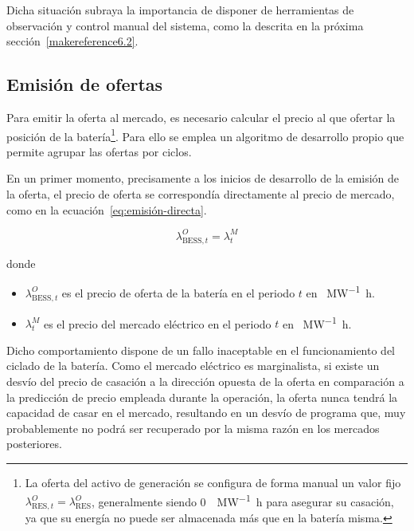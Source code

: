 Dicha situación subraya la importancia de disponer de herramientas de observación y control manual del sistema, como la descrita en la próxima sección~\ref{makereference6.2}.

\subsection{Emisión de ofertas}
\label{makereference6.1.2}

Para emitir la oferta al mercado, es necesario calcular el precio al que ofertar la posición de la batería\footnote{La oferta del activo de generación se configura de forma manual un valor fijo \( \lambda^{O}_{\text{RES}, t} = \lambda^{O}_{\text{RES}} \), generalmente siendo \SI{0}{\text{\euro}\per\mega\watt\hour} para asegurar su casación, ya que su energía no puede ser almacenada más que en la batería misma.}. Para ello se emplea un algoritmo de desarrollo propio que permite agrupar las ofertas por ciclos.

En un primer momento, precisamente a los inicios de desarrollo de la emisión de la oferta, el precio de oferta se correspondía directamente al precio de mercado, como en la ecuación~\ref{eq:emisión-directa}.

\begin{samepage}

  \begin{equation}
    \label{eq:emisión-directa}
    \lambda^{O}_{\text{BESS}, t} = \lambda^{M}_{t}
  \end{equation}

  donde

  \begin{itemize}

    \item \( \lambda^{O}_{\text{BESS}, t} \) es el precio de oferta de la batería en el periodo \( t \) en \si{\text{\euro}\per\mega\watt\hour}.

    \item \( \lambda^{M}_{t} \) es el precio del mercado eléctrico en el periodo \( t \) en \si{\text{\euro}\per\mega\watt\hour}.

  \end{itemize}

\end{samepage}

Dicho comportamiento dispone de un fallo inaceptable en el funcionamiento del ciclado de la batería. Como el mercado eléctrico es marginalista, si existe un desvío del precio de casación a la dirección opuesta de la oferta en comparación a la predicción de precio empleada durante la operación, la oferta nunca tendrá la capacidad de casar en el mercado, resultando en un desvío de programa que, muy probablemente no podrá ser recuperado por la misma razón en los mercados posteriores.

